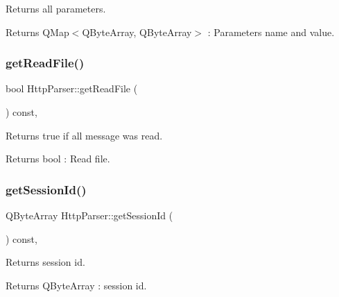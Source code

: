 Returns all parameters. 

\begin{DoxyReturn}{Returns}
Q\+Map$<$\+Q\+Byte\+Array, Q\+Byte\+Array$>$ \+: Parameters name and value. 
\end{DoxyReturn}
\mbox{\label{class_http_parser_a3be6ae977af47186d80b67f26b4cbd69}} 
\subsubsection{\texorpdfstring{get\+Read\+File()}{getReadFile()}}
{\footnotesize\ttfamily bool Http\+Parser\+::get\+Read\+File (\begin{DoxyParamCaption}{ }\end{DoxyParamCaption}) const\hspace{0.3cm}{\ttfamily [inline]}, {\ttfamily [noexcept]}}



Returns true if all message was read. 

\begin{DoxyReturn}{Returns}
bool \+: Read file. 
\end{DoxyReturn}
\mbox{\label{class_http_parser_ad2c849df15ec861fca8911c0519747ae}} 
\subsubsection{\texorpdfstring{get\+Session\+Id()}{getSessionId()}}
{\footnotesize\ttfamily Q\+Byte\+Array Http\+Parser\+::get\+Session\+Id (\begin{DoxyParamCaption}{ }\end{DoxyParamCaption}) const\hspace{0.3cm}{\ttfamily [inline]}, {\ttfamily [noexcept]}}



Returns session id. 

\begin{DoxyReturn}{Returns}
Q\+Byte\+Array \+: session id. 
\end{DoxyReturn}
\mbox{\label{class_http_parser_abbb9bc6fdfbc6f40629d2f8033c9f17f}} 
